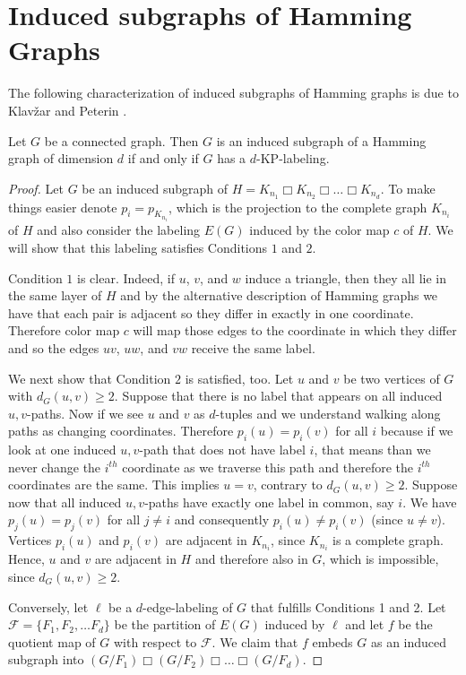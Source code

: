 \documentclass[12pt,a4paper,titlepage,openany]{report}
\begin{document}
\section{Induced subgraphs of Hamming Graphs}

The following characterization of induced subgraphs of Hamming graphs is due to Klav\v zar and Peterin \cite{Iztok}.

\begin{theorem}\label{thm:mainkp}
Let $G$ be a connected graph. Then $G$ is an induced subgraph of a Hamming graph of dimension $d$ if and only if $G$ has a $d$-KP-labeling.
\end{theorem}
\begin{proof}
Let $G$ be an induced subgraph of $H=K_{n_1} \Box K_{n_2}\Box\ldots \Box K_{n_d}$. To make things easier denote $p_i=p_{K_{n_i}}$, which is the projection to the complete graph $K_{n_i}$ of $H$ and also consider the labeling $E(G)$ induced by the color map $c$ of $H$. We will show that this labeling satisfies Conditions $1$ and $2$.

Condition $1$ is clear. Indeed, if $u$, $v$, and $w$ induce a triangle, then they all lie in
the same layer of $H$ and by the alternative description of Hamming graphs we have that each pair is adjacent so they differ in exactly in one coordinate. Therefore color map $c$ will map those edges to the coordinate in which they differ and so the edges $uv$, $uw$, and $vw$ receive the same label.

We next show that Condition $2$ is satisfied, too. Let $u$ and $v$ be two vertices of $G$ with $d_G(u,v)\geq 2$.
Suppose that there is no label that appears on all induced $u, v$-paths. Now if we see $u$ and $v$ as $d$-tuples and we understand walking along paths as changing coordinates. Therefore $p_i(u)=p_i(v)$ for all $i$ because if we look at one induced $u,v$-path that does not have label $i$, that means than we never change the $i^{th}$ coordinate as we traverse this path and therefore the $i^{th}$ coordinates are the same. This implies $u=v$, contrary to $d_G(u,v)\geq 2$. Suppose now that all induced $u, v$-paths have exactly one label in common, say $i$. We have $p_j(u)=p_j(v)$ for all $j\neq i$ and consequently $p_i(u)\neq p_i(v)$ (since $u\neq v$). Vertices $p_i(u)$ and $p_i(v)$ are adjacent in $K_{n_i}$, since $K_{n_i}$ is a complete graph. Hence, $u$ and $v$ are adjacent in $H$ and therefore also in $G$, which is impossible, since $d_G(u,v)\geq 2$.\medskip

Conversely, let $\ell$ be a $d$-edge-labeling of $G$ that fulfills Conditions 1 and 2. Let $\mathcal{F}=\{F_1,F_2,\ldots F_d\}$ be the partition of $E(G)$ induced by $\ell$ and let $f$ be the quotient map of $G$ with respect to $\mathcal{F}$. We claim that $f$ embeds $G$ as an induced subgraph into $(G/ F_1) \Box (G/ F_2) \Box \ldots \Box (G/ F_d)$.


\end{proof}
\end{document}
